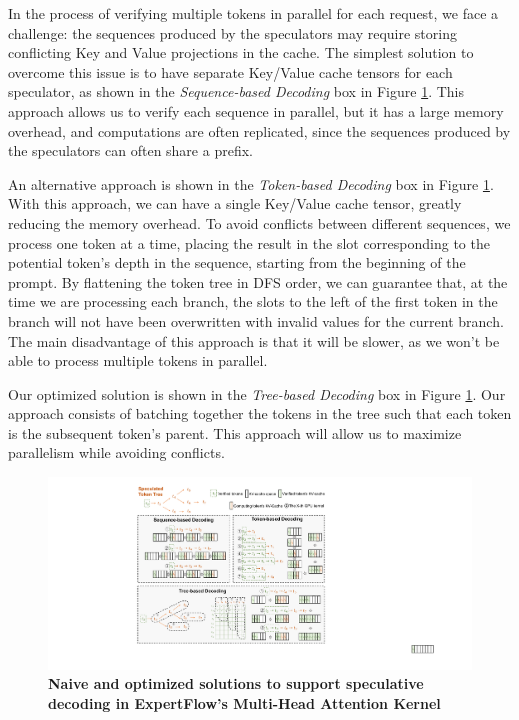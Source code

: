 In the process of verifying multiple tokens in parallel for each request, we face a challenge: the sequences produced by the speculators may require storing conflicting Key and Value projections in the cache. The simplest solution to overcome this issue is to have separate Key/Value cache tensors for each speculator, as shown in the \textit{Sequence-based Decoding} box in Figure \ref{fig:spec-infer-attention-layout}. This approach allows us to verify each sequence in parallel, but it has a large memory overhead, and computations are often replicated, since the sequences produced by the speculators can often share a prefix. 

An alternative approach is shown in the \textit{Token-based Decoding} box in Figure \ref{fig:spec-infer-attention-layout}. With this approach, we can have a single Key/Value cache tensor, greatly reducing the memory overhead. To avoid conflicts between different sequences, we process one token at a time, placing the result in the slot corresponding to the potential token's depth in the sequence, starting from the beginning of the prompt. By flattening the token tree in DFS order, we can guarantee that, at the time we are processing each branch, the slots to the left of the first token in the branch will not have been overwritten with invalid values for the current branch. The main disadvantage of this approach is that it will be slower, as we won't be able to process multiple tokens in parallel.

Our optimized solution is shown in the \textit{Tree-based Decoding} box in Figure \ref{fig:spec-infer-attention-layout}. Our approach consists of batching together the tokens in the tree such that each token is the subsequent token's parent. This approach will allow us to maximize parallelism while avoiding conflicts.

\begin{figure}[H]
    \centering
    \includegraphics[width=\linewidth]{figures/kv_cache_new4.pdf}
    \caption{\textbf{Naive and optimized solutions to support speculative decoding in ExpertFlow's Multi-Head Attention Kernel}}
    \label{fig:spec-infer-attention-layout}
\end{figure}


